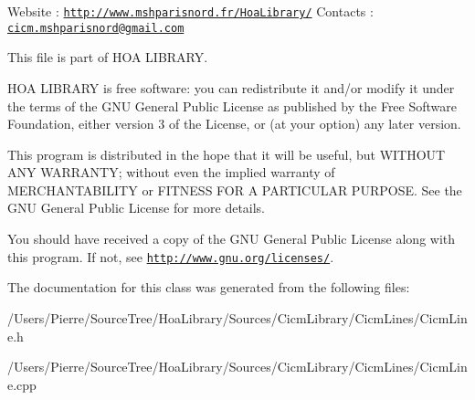 Website \-: \href{http://www.mshparisnord.fr/HoaLibrary/}{\tt http\-://www.\-mshparisnord.\-fr/\-Hoa\-Library/} Contacts \-: \href{mailto:cicm.mshparisnord@gmail.com}{\tt cicm.\-mshparisnord@gmail.\-com}

This file is part of H\-O\-A L\-I\-B\-R\-A\-R\-Y.

H\-O\-A L\-I\-B\-R\-A\-R\-Y is free software\-: you can redistribute it and/or modify it under the terms of the G\-N\-U General Public License as published by the Free Software Foundation, either version 3 of the License, or (at your option) any later version.

This program is distributed in the hope that it will be useful, but W\-I\-T\-H\-O\-U\-T A\-N\-Y W\-A\-R\-R\-A\-N\-T\-Y; without even the implied warranty of M\-E\-R\-C\-H\-A\-N\-T\-A\-B\-I\-L\-I\-T\-Y or F\-I\-T\-N\-E\-S\-S F\-O\-R A P\-A\-R\-T\-I\-C\-U\-L\-A\-R P\-U\-R\-P\-O\-S\-E. See the G\-N\-U General Public License for more details.

You should have received a copy of the G\-N\-U General Public License along with this program. If not, see \href{http://www.gnu.org/licenses/}{\tt http\-://www.\-gnu.\-org/licenses/}. 

The documentation for this class was generated from the following files\-:\begin{DoxyCompactItemize}
\item 
/\-Users/\-Pierre/\-Source\-Tree/\-Hoa\-Library/\-Sources/\-Cicm\-Library/\-Cicm\-Lines/Cicm\-Line.\-h\item 
/\-Users/\-Pierre/\-Source\-Tree/\-Hoa\-Library/\-Sources/\-Cicm\-Library/\-Cicm\-Lines/Cicm\-Line.\-cpp\end{DoxyCompactItemize}
